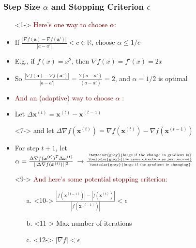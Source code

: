 \documentclass[xcolor={dvipsnames}]{beamer}
\begin{document}
\frame
{
\frametitle{Step Size $\alpha$ and Stopping Criterion $\epsilon$}


\begin{itemize}
\item[]<1-> \textcolor{Maroon}{Here's one way to choose $\alpha$:}
\item<2-> If $\frac{|\nabla f({\boldsymbol a}) - \nabla f({\boldsymbol a'}) |}{|a - a'|} < c \in \mathbb{R}$,
choose $\alpha \leq 1/c$
\item<3-> E.g., if $f(x) = x^2$, then $\nabla f(x) = f'(x) = 2x$
\item<4-> So $\frac{|\nabla f({\boldsymbol a}) - \nabla f({\boldsymbol a'}) |}{|a - a'|} = \frac{2(a-a')}{(a-a')} = 2$, and $\alpha = 1/2$ is optimal
\item[]
\item<5->[]  \textcolor{Maroon}{And an (adaptive) way to choose $\alpha$} \normalsize\textcolor{Maroon}{:} 
\item<6-> Let $\Delta {\boldsymbol x}^{(t)} = {\boldsymbol x}^{(t)} - {\boldsymbol x}^{(t-1)}$
\item[]<7-> and let $\Delta \nabla f({\boldsymbol x}^{(t)}) = \nabla f({\boldsymbol x}^{(t)}) - \nabla f({\boldsymbol x}^{(t-1)})$
\item<8-> For step $t+1$, let $\alpha = \frac{\Delta \nabla f({\boldsymbol x}^{(t)})^T \Delta {\boldsymbol x}^{(t)}}{||\Delta \nabla f({\boldsymbol x}^{(t)})||^2} \; \rightarrow \frac{\overset{\text{ \tiny \textcolor{gray}{large if the change in gradient is}}}{\text{ \tiny \textcolor{gray}{the same direction as just moved}}}}{\text{ \tiny \textcolor{gray}{large if the gradient is changing}}}$
\end{itemize}

\normalsize
{}

\begin{itemize}
\item[]<9->  \textcolor{Maroon}{And here's some potential stopping criterion:}
\begin{enumerate}
\item[a.]<10-> $\frac{|f({\boldsymbol x}^{(t-1)})| - |f({\boldsymbol x}^{(t)})|}{|f({\boldsymbol x}^{(t-1)})|} < \epsilon$
\item[b.]<11-> Max number of iterations
\item[c.]<12-> $|\nabla f| < \epsilon$
\end{enumerate}

\end{itemize}


}
\end{document}
